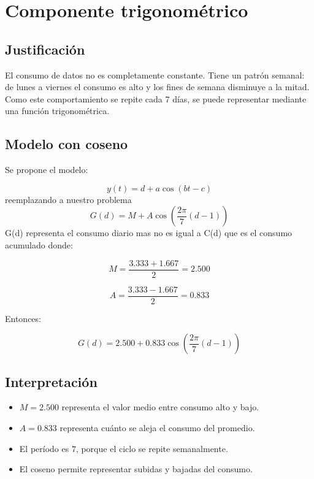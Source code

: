 \documentclass[12pt,a4paper]{article}
\begin{document}
	\section{Componente trigonométrico}
	
	\subsection{Justificación}
	
	El consumo de datos no es completamente constante. Tiene un patrón semanal: de lunes a viernes el consumo es alto y los fines de semana disminuye a la mitad. Como este comportamiento se repite cada 7 días, se puede representar mediante una función trigonométrica.
	
	\subsection{Modelo con coseno}
	
	Se propone el modelo:
	
	\[
	y(t)=d+a\cos\left(bt-c\right)
	\]
	reemplazando a nuestro problema
	\[
	G(d)=M+A\cos\left(\frac{2\pi}{7}(d-1)\right)
	\]
	G(d) representa el consumo diario mas no es igual a C(d) que es el consumo acumulado
	donde:
	
	\[
	M=\frac{3.333+1.667}{2}=2.500
	\]
	
	\[
	A=\frac{3.333-1.667}{2}=0.833
	\]
	
	Entonces:
	
	\[
	\boxed{G(d)=2.500+0.833\cos\left(\frac{2\pi}{7}(d-1)\right)}
	\]
	
	\subsection{Interpretación}
	
	\begin{itemize}
		\item $M=2.500$ representa el valor medio entre consumo alto y bajo.
		\item $A=0.833$ representa cuánto se aleja el consumo del promedio.
		\item El período es $7$, porque el ciclo se repite semanalmente.
		\item El coseno permite representar subidas y bajadas del consumo.
	\end{itemize}
	
\end{document}
